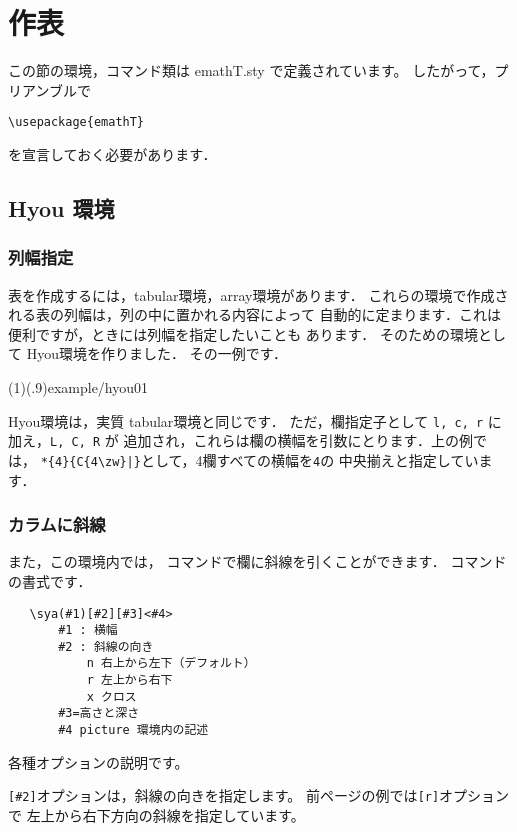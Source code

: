 \section{作表}
この節の環境，コマンド類は \textsf{emathT.sty} で定義されています。
したがって，プリアンブルで
\begin{jquote}
  \verb/\usepackage{emathT}/
\end{jquote}
を宣言しておく必要があります．

\subsection{\textsf{Hyou} 環境}
\subsubsection{列幅指定}
表を作成するには，\textsf{tabular}環境，\textsf{array}環境があります．
これらの環境で作成される表の列幅は，列の中に置かれる内容によって
自動的に定まります．これは便利ですが，ときには列幅を指定したいことも
あります．
そのための環境として \textsf{Hyou}環境を作りました．
その一例です．

\showexample[列幅一定の表](1)(.9){example/hyou01}

\textsf{Hyou}環境は，実質 \textsf{tabular}環境と同じです．
ただ，欄指定子として \texttt{l, c, r} に加え，\texttt{L, C, R} が
追加され，これらは欄の横幅を引数にとります．上の例では，
\verb/*{4}{C{4\zw}|}/として，4欄すべての横幅を\texttt{4\zw}の
中央揃えと指定しています．

\subsubsection{カラムに斜線}
また，この環境内では， コマンドで欄に斜線を引くことができます．
コマンドの書式です．

\begin{boxnote}
\begin{verbatim}
   \sya(#1)[#2][#3]<#4>
       #1 : 横幅
       #2 : 斜線の向き
           n 右上から左下（デフォルト）
           r 左上から右下
           x クロス
       #3=高さと深さ
       #4 picture 環境内の記述
\end{verbatim}
\end{boxnote}

各種オプションの説明です。

\verb/[#2]/オプションは，斜線の向きを指定します。
前ページの例では\verb/[r]/オプションで
左上から右下方向の斜線を指定しています。

